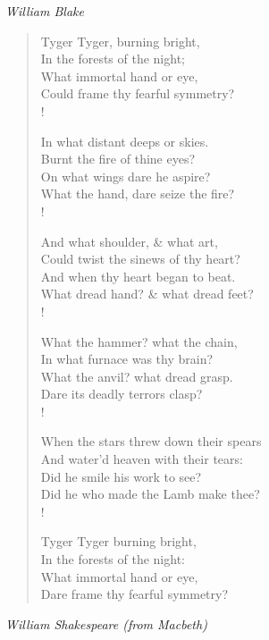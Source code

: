 \documentclass[10pt]{memoir}
\newcommand{\poemauthor}[1]{{\small\itshape #1}\par\medskip}
\begin{document}
\clearpage

\poemauthor{William Blake}

\begin{verse}
Tyger Tyger, burning bright,\\
In the forests of the night;\\
What immortal hand or eye,\\
Could frame thy fearful symmetry?\\!

In what distant deeps or skies.\\
Burnt the fire of thine eyes?\\
On what wings dare he aspire?\\
What the hand, dare seize the fire?\\!

And what shoulder, \& what art,\\
Could twist the sinews of thy heart?\\
And when thy heart began to beat.\\
What dread hand? \& what dread feet?\\!

What the hammer? what the chain,\\
In what furnace was thy brain?\\
What the anvil? what dread grasp.\\
Dare its deadly terrors clasp?\\!

When the stars threw down their spears\\
And water'd heaven with their tears:\\
Did he smile his work to see?\\
Did he who made the Lamb make thee?\\!

Tyger Tyger burning bright,\\
In the forests of the night:\\
What immortal hand or eye,\\
Dare frame thy fearful symmetry?
\end{verse}

\clearpage

\poemauthor{William Shakespeare (from \textit{Macbeth})}
\end{document}
